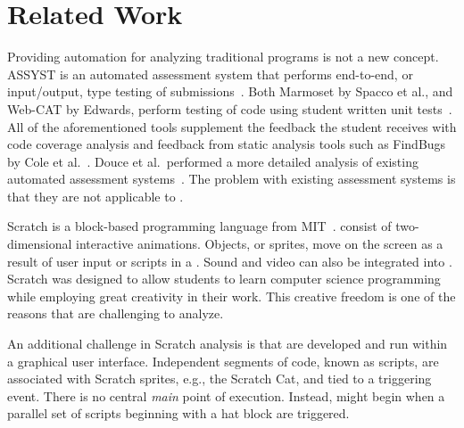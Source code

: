 \section{Related Work}

Providing automation for analyzing traditional programs is not a new concept.
ASSYST is an automated assessment system that performs end-to-end, or
input/output, type testing of
submissions~\cite{Jackson:1997:GSP:268084.268210}. Both Marmoset by Spacco et
al., and Web-CAT by Edwards, perform testing of code using student written unit
tests~\cite{Spacco:2006:EMD:1140124.1140131,
  Edwards:2003:RCS:949344.949390}. All of the aforementioned tools supplement
the feedback the student receives with code coverage analysis and feedback from
static analysis tools such as FindBugs by Cole et
al.~\cite{Cole:2006:IYS:1176617.1176667}. Douce et al.\ performed a more
detailed analysis of existing automated assessment
systems~\cite{Douce:2005:ATA:1163405.1163409}.  The problem with existing
assessment systems is that they are not applicable to .

Scratch is a block-based programming language from
MIT~\cite{Maloney:2010:SPL:1868358.1868363}.   consist of
two-dimensional interactive animations.  Objects, or sprites, move on the
screen as a result of user input or scripts in a \sprogram{}.  Sound and video
can also be integrated into .  Scratch was designed to allow
students to learn computer science programming while employing great creativity
in their work.  This creative freedom is one of the reasons that 
are challenging to analyze.

An additional challenge in Scratch analysis is that  are developed
and run within a graphical user interface.  Independent segments of code, known
as scripts, are associated with Scratch sprites, e.g., the Scratch Cat, and
tied to a triggering event.  There is no central \emph{main} point of
execution.  Instead,  might begin when a parallel set of scripts
beginning with a \greenflag{} hat block are triggered.

